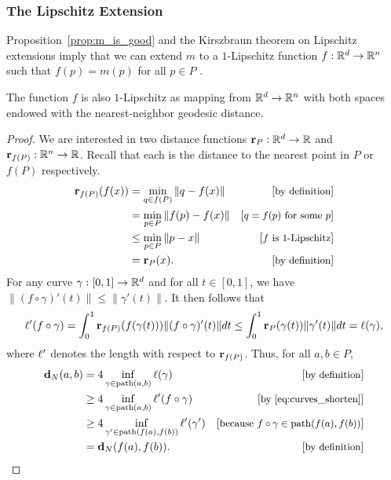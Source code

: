 \subsubsection{The Lipschitz Extension} %
\label{sec:lip_extension}

  Proposition~\ref{prop:m_is_good} and the Kirszbraun theorem on Lipschitz extensions imply that we can extend $m$ to a $1$-Lipschitz function $f: \mathbb{R}^d\to \mathbb{R}^n$ such that $f(p) = m(p)$ for all $p\in P$ \cite{Kirszbraun1934,Valentine1945,brehm1981}.

  \begin{lemma}\label{lem:dist_N_lipschitz}
    The function $f$ is also $1$-Lipschitz as mapping from $\mathbb{R}^d\to \mathbb{R}^n$ with both spaces endowed with the nearest-neighbor geodesic distance.
  \end{lemma}
  \begin{proof}
    We are interested in two distance functions $\mathbf{r}_P:\mathbb{R}^d \to \mathbb{R}$ and $\mathbf{r}_{f(P)}: \mathbb{R}^n\to \mathbb{R}$.
    Recall that each is the distance to the nearest point in $P$ or $f(P)$ respectively.
    \begin{align*}
      \mathbf{r}_{f(P)}(f(x)) 
        &= \min_{q\in f(P)} \|q - f(x)\| &\left[\text{\small{by definition}}\right]\\
        &= \min_{p\in P} \|f(p) - f(x)\| &\left[\text{\small{$q = f(p)$ for some $p$}}\right]\\
        &\le \min_{p\in P} \|p - x\| &\left[\text{\small{$f$ is $1$-Lipschitz}}\right]\\ 
        &= \mathbf{r}_P(x). &\left[\text{\small{by definition}}\right]
    \end{align*}
    For any curve $\gamma:[0,1]\to \mathbb{R}^d$ and for all $t\in [0,1]$, we have $\|(f\circ \gamma)'(t)\| \le \|\gamma'(t)\|$.
    It then follows that
    \begin{equation}\label{eq:curves_shorten}
      \ell'(f\circ \gamma) = \int_0^1 \mathbf{r}_{f(P)}(f(\gamma(t)))\|(f\circ\gamma)'(t)\|dt \le \int_0^1 \mathbf{r}_{P}(\gamma(t))\|\gamma'(t)\|dt = \ell(\gamma),
    \end{equation}
    where $\ell'$ denotes the length with respect to $\mathbf{r}_{f(P)}$.
    Thus, for all $a,b\in P$,
    \begin{align*}
      \mathbf{d}_N(a,b)
        &= 4 \inf_{\gamma\in \mathrm{path}(a,b)} \ell(\gamma) &\left[\text{\small{by definition}}\right]\\
        &\ge 4 \inf_{\gamma\in \mathrm{path}(a,b)} \ell'(f\circ\gamma) &\left[\text{\small{by \eqref{eq:curves_shorten}}}\right]\\
        &\ge 4 \inf_{\gamma'\in \mathrm{path}(f(a),f(b))} \ell'(\gamma') &\left[\text{\small{because $f\circ\gamma\in \mathrm{path}(f(a), f(b))$}}\right]\\
        &= \mathbf{d}_N(f(a), f(b)). &\left[\text{\small{by definition}}\right]
    \end{align*}
  \end{proof}
  
